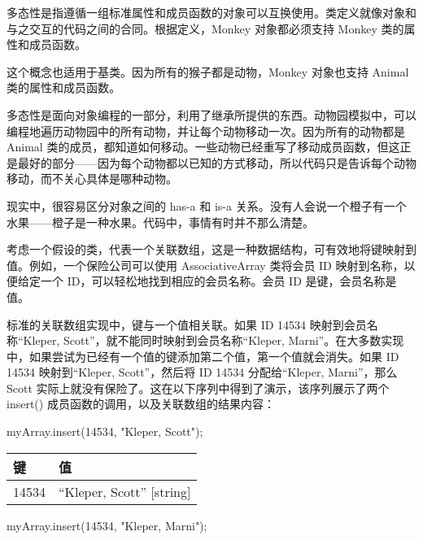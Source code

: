 
多态性是指遵循一组标准属性和成员函数的对象可以互换使用。类定义就像对象和与之交互的代码之间的合同。根据定义，Monkey 对象都必须支持 Monkey 类的属性和成员函数。

这个概念也适用于基类。因为所有的猴子都是动物，Monkey 对象也支持 Animal 类的属性和成员函数。

多态性是面向对象编程的一部分，利用了继承所提供的东西。动物园模拟中，可以编程地遍历动物园中的所有动物，并让每个动物移动一次。因为所有的动物都是 Animal 类的成员，都知道如何移动。一些动物已经重写了移动成员函数，但这正是最好的部分——因为每个动物都以已知的方式移动，所以代码只是告诉每个动物移动，而不关心具体是哪种动物。


现实中，很容易区分对象之间的 has-a 和 is-a 关系。没有人会说一个橙子有一个水果——橙子是一种水果。代码中，事情有时并不那么清楚。

考虑一个假设的类，代表一个关联数组，这是一种数据结构，可有效地将键映射到值。例如，一个保险公司可以使用 AssociativeArray 类将会员 ID 映射到名称，以便给定一个 ID，可以轻松地找到相应的会员名称。会员 ID 是键，会员名称是值。

标准的关联数组实现中，键与一个值相关联。如果 ID 14534 映射到会员名称“Kleper, Scott”，就不能同时映射到会员名称“Kleper, Marni”。在大多数实现中，如果尝试为已经有一个值的键添加第二个值，第一个值就会消失。如果 ID 14534 映射到“Kleper, Scott”，然后将 ID 14534 分配给“Kleper, Marni”，那么 Scott 实际上就没有保险了。这在以下序列中得到了演示，该序列展示了两个 insert() 成员函数的调用，以及关联数组的结果内容：

\begin{cpp}
myArray.insert(14534, "Kleper, Scott");
\end{cpp}

\begin{longtable}{|l|l|}
\hline
\textbf{键} & \textbf{值}              \\ \hline
\endfirsthead
%
\endhead
%
14534         & “Kleper, Scott” {[}string{]} \\ \hline
\end{longtable}

\begin{cpp}
myArray.insert(14534, "Kleper, Marni");
\end{cpp}

